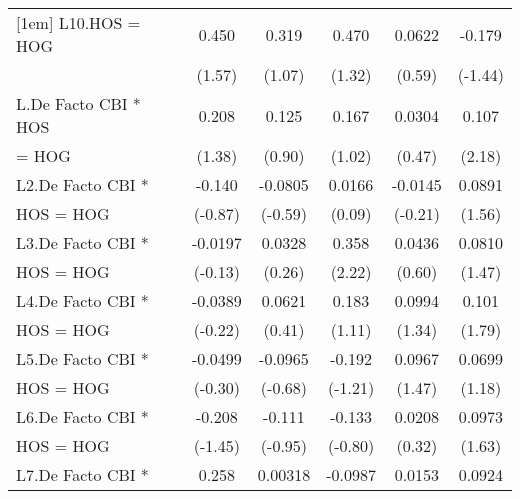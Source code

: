 {\begin{tabular}{l*{5}{c}}
[1em]
L10.HOS = HOG       &       0.450         &       0.319         &       0.470         &      0.0622         &      -0.179         \\
                    &      (1.57)         &      (1.07)         &      (1.32)         &      (0.59)         &     (-1.44)         \\
[1em]
L.De Facto CBI * HOS&       0.208         &       0.125         &       0.167         &      0.0304         &       0.107\sym{*}  \\
= HOG               &      (1.38)         &      (0.90)         &      (1.02)         &      (0.47)         &      (2.18)         \\
[1em]
L2.De Facto CBI *   &      -0.140         &     -0.0805         &      0.0166         &     -0.0145         &      0.0891         \\
HOS = HOG           &     (-0.87)         &     (-0.59)         &      (0.09)         &     (-0.21)         &      (1.56)         \\
[1em]
L3.De Facto CBI *   &     -0.0197         &      0.0328         &       0.358\sym{*}  &      0.0436         &      0.0810         \\
HOS = HOG           &     (-0.13)         &      (0.26)         &      (2.22)         &      (0.60)         &      (1.47)         \\
[1em]
L4.De Facto CBI *   &     -0.0389         &      0.0621         &       0.183         &      0.0994         &       0.101         \\
HOS = HOG           &     (-0.22)         &      (0.41)         &      (1.11)         &      (1.34)         &      (1.79)         \\
[1em]
L5.De Facto CBI *   &     -0.0499         &     -0.0965         &      -0.192         &      0.0967         &      0.0699         \\
HOS = HOG           &     (-0.30)         &     (-0.68)         &     (-1.21)         &      (1.47)         &      (1.18)         \\
[1em]
L6.De Facto CBI *   &      -0.208         &      -0.111         &      -0.133         &      0.0208         &      0.0973         \\
HOS = HOG           &     (-1.45)         &     (-0.95)         &     (-0.80)         &      (0.32)         &      (1.63)         \\
[1em]
L7.De Facto CBI *   &       0.258         &     0.00318         &     -0.0987         &      0.0153         &      0.0924         \\

\end{tabular}}
